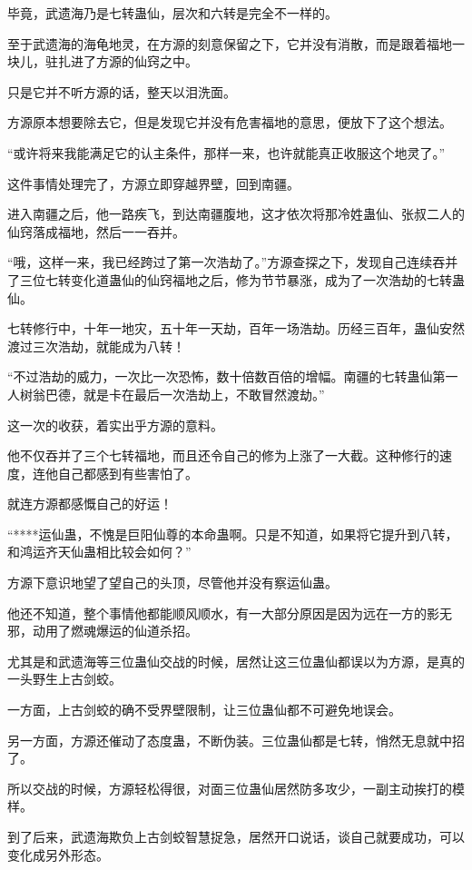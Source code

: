 \begin{this_body}
毕竟，武遗海乃是七转蛊仙，层次和六转是完全不一样的。

至于武遗海的海龟地灵，在方源的刻意保留之下，它并没有消散，而是跟着福地一块儿，驻扎进了方源的仙窍之中。

只是它并不听方源的话，整天以泪洗面。

方源原本想要除去它，但是发现它并没有危害福地的意思，便放下了这个想法。

“或许将来我能满足它的认主条件，那样一来，也许就能真正收服这个地灵了。”

这件事情处理完了，方源立即穿越界壁，回到南疆。

进入南疆之后，他一路疾飞，到达南疆腹地，这才依次将那冷姓蛊仙、张叔二人的仙窍落成福地，然后一一吞并。

“哦，这样一来，我已经跨过了第一次浩劫了。”方源查探之下，发现自己连续吞并了三位七转变化道蛊仙的仙窍福地之后，修为节节暴涨，成为了一次浩劫的七转蛊仙。

七转修行中，十年一地灾，五十年一天劫，百年一场浩劫。历经三百年，蛊仙安然渡过三次浩劫，就能成为八转！

“不过浩劫的威力，一次比一次恐怖，数十倍数百倍的增幅。南疆的七转蛊仙第一人树翁巴德，就是卡在最后一次浩劫上，不敢冒然渡劫。”

这一次的收获，着实出乎方源的意料。

他不仅吞并了三个七转福地，而且还令自己的修为上涨了一大截。这种修行的速度，连他自己都感到有些害怕了。

就连方源都感慨自己的好运！

“****运仙蛊，不愧是巨阳仙尊的本命蛊啊。只是不知道，如果将它提升到八转，和鸿运齐天仙蛊相比较会如何？”

方源下意识地望了望自己的头顶，尽管他并没有察运仙蛊。

他还不知道，整个事情他都能顺风顺水，有一大部分原因是因为远在一方的影无邪，动用了燃魂爆运的仙道杀招。

尤其是和武遗海等三位蛊仙交战的时候，居然让这三位蛊仙都误以为方源，是真的一头野生上古剑蛟。

一方面，上古剑蛟的确不受界壁限制，让三位蛊仙都不可避免地误会。

另一方面，方源还催动了态度蛊，不断伪装。三位蛊仙都是七转，悄然无息就中招了。

所以交战的时候，方源轻松得很，对面三位蛊仙居然防多攻少，一副主动挨打的模样。

到了后来，武遗海欺负上古剑蛟智慧捉急，居然开口说话，谈自己就要成功，可以变化成另外形态。


\end{this_body}
